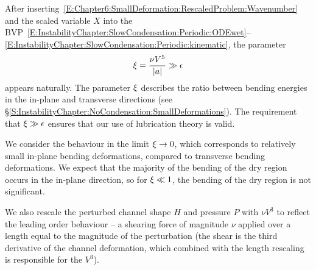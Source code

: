 \begin{subappendices}
After inserting~\eqref{E:Chapter6:SmallDeformation:RescaledProblem:Wavenumber} and the scaled variable $X$ into the BVP~\eqref{E:InstabilityChapter:SlowCondensation:Periodic:ODEwet}--\eqref{E:InstabilityChapter:SlowCondensation:Periodic:kinematic}, the parameter
\begin{equation}\label{AE:InstabilityChapter:SmallDeformation:RescaledProblem:OtherSmallPar}
\xi= \frac{\nu V^5}{|a|} \gg \epsilon
\end{equation}
appears naturally. The parameter $\xi$ describes the ratio between bending energies in the in-plane and transverse directions (see \S\ref{S:InstabilityChapter:NoCondensation:SmallDeformations}). The requirement that $\xi \gg \epsilon$ ensures that our use of lubrication theory is valid.

We consider the behaviour in the limit $\xi \to 0$, which corresponds to relatively small in-plane bending deformations, compared to transverse bending deformations. We expect that the majority of the bending of the dry region occurs in the in-plane direction, so for $\xi \ll 1$, the bending of the dry region is not significant. 

We also rescale the perturbed channel shape $H$ and pressure $P$ with $\nu V^3$ to reflect the leading order behaviour -- a shearing force of magnitude $\nu$ applied over a length equal to the magnitude of the perturbation (the shear is the third derivative of the channel deformation, which combined with the length rescaling is responsible for the $V^3$).


\end{subappendices}
